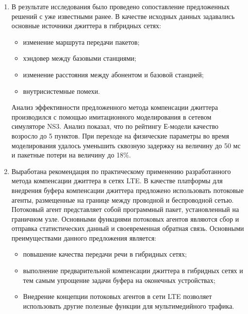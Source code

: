 \begin{enumerate}
 \item %
В результате исследования было проведено сопоставление предложенных решений с уже известными ранее. 
В качестве исходных данных задавались основные источники джиттера в гибридных сетях:
 \begin{itemize}
  \item изменение маршрута передачи пакетов;
  \item хэндовер между базовыми станциями;
  \item изменение расстояния между абонентом и базовой станцией;
  \item внутрисистемные помехи.
 \end{itemize}
Анализ эффективности предложенного метода компенсации джиттера производился с помощью имитационного моделирования в сетевом симуляторе NS3.
Анализ показал, что по рейтингу Е-модели качество возросло до 5 пунктов.
При переходе на физические параметры во время моделирования удалось уменьшить сквозную задержку на величину до 50 мс и пакетные потери на величину до 18\%.
 \item Выработана рекомендация по практическому применению разработанного метода компенсации джиттера в сетях LTE.
 В качестве платформы для внедрения буфера компенсации джиттера предложено использовать потоковые агенты, размещенные на границе между проводной и беспроводной сетью.
 Потоковый агент представляет собой программный пакет, установленный на граничном узле. 
 Основными функциями потоковых агентов являются сбор и отправка статистических данный и своевременная обратная связь.
 Основными преимуществами данного предложения является:
 \begin{itemize}
  \item повышение качества передачи речи в гибридных сетях;
  \item выполнение предварительной компенсации джиттера в гибридных сетях и тем самым упрощение задачи буфера на оконечных устройствах;
  \item Внедрение концепции потоковых агентов в сети LTE позволяет использовать другие полезные функции для мультимедийного трафика.
 \end{itemize}

\end{enumerate}




